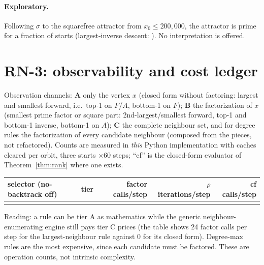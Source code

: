 \documentclass[11pt]{article}
\theoremstyle{remark}\newtheorem{remark}[theorem]{Remark}
\begin{document}
\paragraph{Exploratory.} Following $\sigma$ to the squarefree attractor from $x_0\le200{,}000$, the attractor is prime for a fraction \FracMinAll{} of starts (largest-inverse descent: \FracMaxI{}). No interpretation is offered.

\section{RN-3: observability and cost ledger}
Observation channels: \textbf{A} only the vertex $x$ (closed form without factoring: largest and smallest forward, i.e.\ top-1 on $F$/$A$, bottom-1 on $F$); \textbf{B} the factorization of $x$ (smallest prime factor or square part: 2nd-largest/smallest forward, top-1 and bottom-1 inverse, bottom-1 on $A$); \textbf{C} the complete neighbour set, and for degree rules the factorization of every candidate neighbour (composed from the pieces, not refactored). Counts are measured in \emph{this} Python implementation with caches cleared per orbit, three starts $\times60$ steps; ``cf'' is the closed-form evaluator of Theorem~\ref{thm:rank} where one exists.
\begin{center}\scriptsize\begin{tabular}{lcrrr}\toprule selector (no-backtrack off) & tier & factor calls/step & $\rho$ iterations/step & cf calls/step\\\midrule

\\\bottomrule\end{tabular}\end{center}
Reading: a rule can be tier A as mathematics while the generic neighbour-enumerating engine still pays tier C prices (the table shows 24 factor calls per step for the largest-neighbour rule against 0 for its closed form). Degree-max rules are the most expensive, since each candidate must be factored. These are operation counts, not intrinsic complexity.
\end{document}
